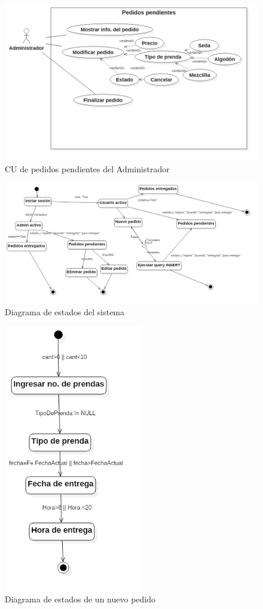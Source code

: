 \begin{figure}[htb]
\begin{center}
\includegraphics[width=15cm]{./imagenes/diagramas/CU_PedidosPendientes(Admin).png}
\end{center}
\caption{CU de pedidos pendientes del Administrador}
\end{figure}


\begin{figure}[htb]
\begin{center}
\includegraphics[width=18cm]{./imagenes/diagramas/Estado_lavanderia.png}
\end{center}
\caption{Diagrama de estados del sistema}
\end{figure}


\begin{figure}[htb]
\begin{center}
\includegraphics[width=6cm]{./imagenes/diagramas/Estados_lavanderia2.png}
\end{center}
\caption{Diagrama de estados de un nuevo pedido}
\end{figure}
